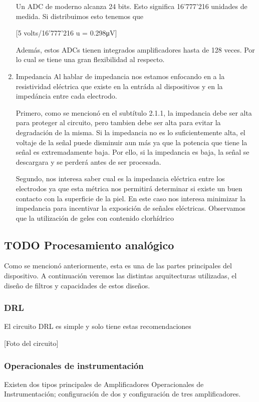 \begin{enumerate}
Un ADC de moderno alcanza 24 bits. Esto significa 16’777’216 unidades de medida. Si distribuimos esto tenemos que

[5 volts/16’777’216 u = 0.298μV]

Además, estos ADCs tienen integrados amplificadores hasta de 128 veces. Por lo cual se tiene una gran flexibilidad al respecto.

\item Impedancia
\label{sec:org0c8d236}
Al hablar de impedancia nos estamos enfocando en a la resistividad eléctrica que existe en la entráda al dispositivos y en la impedáncia entre cada electrodo.

Primero, como se mencionó en el subtítulo 2.1.1, la impedancia debe ser alta para proteger al circuito, pero tambien debe ser alta para evitar la degradación de la misma. Si la impedancia no es lo suficientemente alta, el voltaje de la señal puede disminuir aun más ya que la potencia que tiene la señal es extremadamente baja. Por ello, si la impedancia es baja, la señal se descargara y se perderá antes de ser procesada.

Segundo, nos interesa saber cual es la impedancia eléctrica entre los electrodos ya que esta métrica nos permitirá determinar si existe un buen contacto con la superficie de la piel. En este caso nos interesa minimizar la impedancia para incentivar la exposición de señales eléctricas. Observamos que la utilización de geles con contenido clorhídrico
\end{enumerate}

\subsection{{\bfseries\sffamily TODO} Procesamiento analógico}
\label{sec:org300723c}
Como se mencionó anteriormente, esta es una de las partes principales del dispositivo. A continuación veremos las distintas arquitecturas utilizadas, el diseño de filtros y capacidades de estos diseños.

\subsubsection{DRL}
\label{sec:org2d02ee5}
El circuito DRL es simple y solo tiene estas recomendaciones 

[Foto del circuito]

\subsubsection{Operacionales de instrumentación}
\label{sec:org0c52c34}
Existen dos tipos principales de Amplificadores Operacionales de Instrumentación; configuración de dos y configuración de tres amplificadores.

